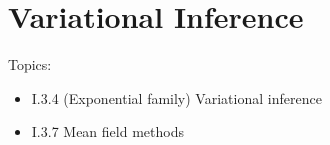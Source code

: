 \chapter{Variational Inference}


Topics:
\begin{itemize}
    \item I.3.4 (Exponential family) Variational inference
    \item I.3.7 Mean field methods
\end{itemize}